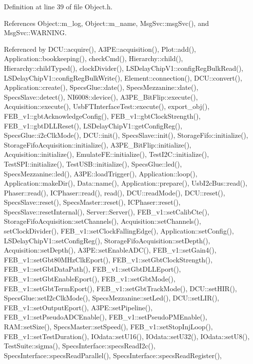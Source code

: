 Definition at line 39 of file Object.\+h.



References Object\+::m\+\_\+log, Object\+::m\+\_\+name, Msg\+Svc\+::msg\+Svc(), and Msg\+Svc\+::\+W\+A\+R\+N\+I\+NG.



Referenced by D\+C\+U\+::acquire(), A3\+P\+E\+::acquisition(), Plot\+::add(), Application\+::bookkeeping(), check\+Cmd(), Hierarchy\+::child(), Hierarchy\+::child\+Typed(), clock\+Divider(), L\+S\+Delay\+Chip\+V1\+::config\+Reg\+Bulk\+Read(), L\+S\+Delay\+Chip\+V1\+::config\+Reg\+Bulk\+Write(), Element\+::connection(), D\+C\+U\+::convert(), Application\+::create(), Specs\+Glue\+::date(), Specs\+Mezzanine\+::date(), Specs\+Slave\+::detect(), N\+I6008\+::device(), A3\+P\+E\+\_\+\+Bit\+Flip\+::execute(), Acquisition\+::execute(), Usb\+F\+T\+Interface\+Test\+::execute(), export\+\_\+obj(), F\+E\+B\+\_\+v1\+::gbt\+Acknowledge\+Config(), F\+E\+B\+\_\+v1\+::gbt\+Clock\+Strength(), F\+E\+B\+\_\+v1\+::gbt\+D\+L\+L\+Reset(), L\+S\+Delay\+Chip\+V1\+::get\+Config\+Reg(), Specs\+Glue\+::i2c\+Clk\+Mode(), D\+C\+U\+::init(), Specs\+Slave\+::init(), Storage\+Fifo\+::initialize(), Storage\+Fifo\+Acquisition\+::initialize(), A3\+P\+E\+\_\+\+Bit\+Flip\+::initialize(), Acquisition\+::initialize(), Emulate\+F\+E\+::initialize(), Test\+I2\+C\+::initialize(), Test\+S\+P\+I\+::initialize(), Test\+U\+S\+B\+::initialize(), Specs\+Glue\+::led(), Specs\+Mezzanine\+::led(), A3\+P\+E\+::load\+Trigger(), Application\+::loop(), Application\+::make\+Dir(), Data\+::name(), Application\+::prepare(), Usb\+I2c\+Bus\+::read(), Phaser\+::read(), I\+C\+Phaser\+::read(), read(), D\+C\+U\+::read\+Mode(), D\+C\+U\+::reset(), Specs\+Slave\+::reset(), Specs\+Master\+::reset(), I\+C\+Phaser\+::reset(), Specs\+Slave\+::reset\+Internal(), Server\+::\+Server(), F\+E\+B\+\_\+v1\+::set\+Calib\+Cte(), Storage\+Fifo\+Acquisition\+::set\+Channels(), Acquisition\+::set\+Channels(), set\+Clock\+Divider(), F\+E\+B\+\_\+v1\+::set\+Clock\+Falling\+Edge(), Application\+::set\+Config(), L\+S\+Delay\+Chip\+V1\+::set\+Config\+Reg(), Storage\+Fifo\+Acquisition\+::set\+Depth(), Acquisition\+::set\+Depth(), A3\+P\+E\+::set\+Enable\+A\+D\+C(), F\+E\+B\+\_\+v1\+::set\+Gain4(), F\+E\+B\+\_\+v1\+::set\+Gbt80\+M\+Hz\+Clk\+Eport(), F\+E\+B\+\_\+v1\+::set\+Gbt\+Clock\+Strength(), F\+E\+B\+\_\+v1\+::set\+Gbt\+Data\+Path(), F\+E\+B\+\_\+v1\+::set\+Gbt\+D\+L\+L\+Eport(), F\+E\+B\+\_\+v1\+::set\+Gbt\+Enable\+Eport(), F\+E\+B\+\_\+v1\+::set\+Gbt\+Mode(), F\+E\+B\+\_\+v1\+::set\+Gbt\+Term\+Eport(), F\+E\+B\+\_\+v1\+::set\+Gbt\+Track\+Mode(), D\+C\+U\+::set\+H\+I\+R(), Specs\+Glue\+::set\+I2c\+Clk\+Mode(), Specs\+Mezzanine\+::set\+Led(), D\+C\+U\+::set\+L\+I\+R(), F\+E\+B\+\_\+v1\+::set\+Output\+Eport(), A3\+P\+E\+::set\+Pipeline(), F\+E\+B\+\_\+v1\+::set\+Pseudo\+A\+D\+C\+Enable(), F\+E\+B\+\_\+v1\+::set\+Pseudo\+P\+M\+Enable(), R\+A\+M\+::set\+Size(), Specs\+Master\+::set\+Speed(), F\+E\+B\+\_\+v1\+::set\+Stop\+Inj\+Loop(), F\+E\+B\+\_\+v1\+::set\+Test\+Duration(), I\+Odata\+::set\+U16(), I\+Odata\+::set\+U32(), I\+Odata\+::set\+U8(), Test\+Suite\+::sigma(), Specs\+Interface\+::specs\+Read\+I2c(), Specs\+Interface\+::specs\+Read\+Parallel(), Specs\+Interface\+::specs\+Read\+Register(), 